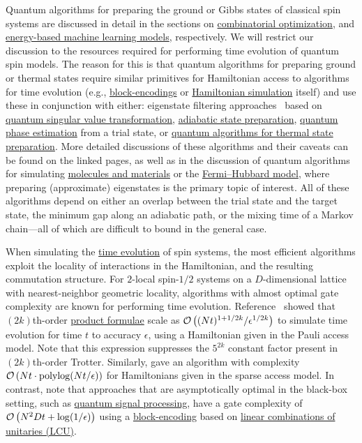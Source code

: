 \begin{refsection}
Quantum algorithms for preparing the ground or Gibbs states of classical spin systems are discussed in detail in the sections on \hyperref[appl:CombOpt]{combinatorial optimization}, and \hyperref[appl:EnergyBasedML]{energy-based machine learning models}, respectively. We will restrict our discussion to the resources required for performing time evolution of quantum spin models. The reason for this is that quantum algorithms for preparing ground or thermal states require similar primitives for Hamiltonian access to algorithms for time evolution (e.g., \hyperref[prim:BlockEncodings]{block-encodings} or \hyperref[prim:HamiltonianSimulation]{Hamiltonian simulation} itself) and use these in conjunction with either: eigenstate filtering approaches~\cite{lin2019OptimalQEigenstateFiltering,lin2020NearOptimalGroundState} based on \hyperref[prim:QSVT]{quantum singular value transformation}, \hyperref[prim:QuantumAdiabaticAlgorithm]{adiabatic state preparation}, \hyperref[prim:QPE]{quantum phase estimation} from a trial state, or \hyperref[prim:GibbsSampling]{quantum algorithms for thermal state preparation}. More detailed discussions of these algorithms and their caveats can be found on the linked pages, as well as in the discussion of quantum algorithms for simulating \hyperref[appl:ElectronicStructure]{molecules and materials} or the \hyperref[appl:FermiHubbard]{Fermi--Hubbard model}, where preparing (approximate) eigenstates is the primary topic of interest. All of these algorithms depend on either an overlap between the trial state and the target state, the minimum gap along an adiabatic path, or the mixing time of a Markov chain---all of which are difficult to bound in the general case.

When simulating the \hyperref[prim:HamiltonianSimulation]{time evolution} of spin systems, the most efficient algorithms exploit the locality of interactions in the Hamiltonian, and the resulting commutation structure. For $2$-local spin-$1/2$ systems on a $D$-dimensional lattice with nearest-neighbor geometric locality, algorithms with almost optimal gate complexity are known for performing time evolution. Reference~\cite{childs2019NearlyOptimalLattSim} showed that $(2k)$th-order \hyperref[prim:ProductFormulae]{product formulae} scale as $\mathcal{O}\left( (Nt)^{1+1/2k} / \epsilon^{1/2k}  \right)$ to simulate time evolution for time $t$ to accuracy $\epsilon$, using a Hamiltonian given in the Pauli access model. Note that this expression suppresses the $5^{2k}$ constant factor present in $(2k)$th-order Trotter. Similarly, \cite{haah2018QAlgSimLatticeHam} gave an algorithm with complexity $\mathcal{O}\left( Nt \cdot \mathrm{polylog}(Nt/\epsilon) \right)$ for Hamiltonians given in the sparse access model. In contrast, note that approaches that are asymptotically optimal in the black-box setting, such as \hyperref[prim:QSPqubitization]{quantum signal processing}, have a gate complexity of $\mathcal{O}\left( N^2Dt + \log(1/\epsilon) \right)$ using a \hyperref[prim:BlockEncodings]{block-encoding} based on \hyperref[prim:LCU]{linear combinations of unitaries (LCU)}.




\end{refsection}
